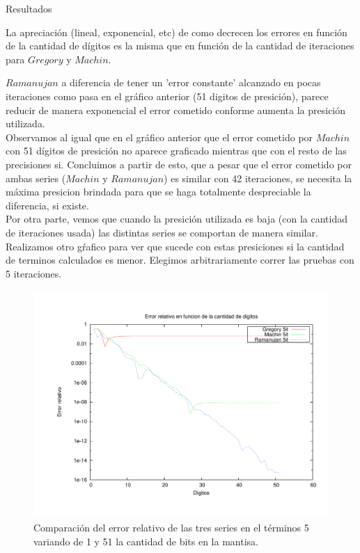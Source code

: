 \begin{section}{Resultados}
	\VSP
	
	La apreciación (lineal, exponencial, etc) de como decrecen los errores en función de la cantidad de dígitos es la misma que en función de la cantidad de iteraciones para $Gregory$ y $Machin$.
	
	$Ramanujan$ a diferencia de tener un 'error constante' alcanzado en pocas iteraciones como pasa en el gráfico anterior (51 digitos de presición), parece reducir de manera exponencial el error cometido conforme aumenta la presición utilizada.\\
	
	Observamos al igual que en el gráfico anterior que el error cometido por $Machin$ con 51 dígitos de presición no aparece graficado mientras que con el resto de las precisiones si. Concluimos a partir de esto, que a pesar que el error cometido por ambas series ($Machin$ y $Ramanujan$) es similar con 42 iteraciones, se necesita la máxima presicion brindada para que se haga totalmente despreciable la diferencia, si existe.\\

	Por otra parte, vemos que cuando la presición utilizada es baja (con la cantidad de iteraciones usada) las distintas series se comportan de manera similar. Realizamos otro gŕafico para ver que sucede con estas presiciones si la cantidad de terminos calculados es menor. Elegimos arbitrariamente correr las pruebas con 5 iteraciones.
	
	\begin{figure}[H]
	  \centering
		\includegraphics[width=14cm]{graficos/comparacion_5it_1a51p.pdf}
	  \caption{Comparación del error relativo de las tres series en el términos 5 variando de 1 y 51 la cantidad de bits en la mantisa.}
	  \label{fig:5it}
	\end{figure}
	

\end{section}
